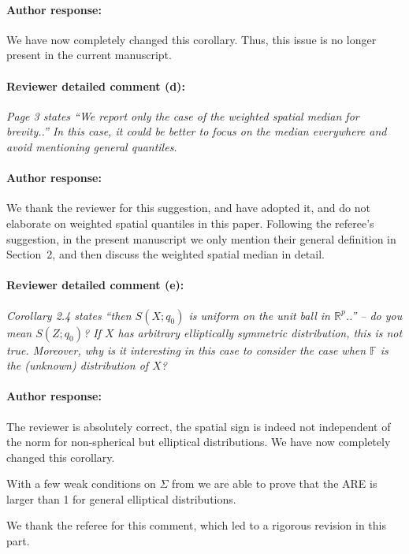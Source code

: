 \documentclass[11pt,letterpaper]{article}
\newcommand{\BF}{{\mathbb{F}}}
\newcommand{\BR}{{\mathbb{R}}}
\theoremstyle{definition} \newtheorem{Definition}[Theorem]{Definition}
\begin{document}
\paragraph{Author response:}
We have now completely changed this corollary. Thus, this issue is no longer present in the current manuscript. 


\paragraph{Reviewer detailed comment (d):}
\textit{Page 3 states “We report only the case of the weighted spatial median for brevity..” In this case, it could be better to focus on the median everywhere and avoid mentioning general quantiles.
}

\paragraph{Author response:}
We thank the reviewer for this suggestion, and have adopted it, and do not elaborate on weighted spatial quantiles in this paper. Following the referee's suggestion, in the present manuscript we only mention their general definition in Section~2, and then discuss the weighted spatial median in detail. 

\paragraph{Reviewer detailed comment (e):}
\textit{Corollary 2.4 states “then $S(X; q_0)$ is uniform on the unit ball in $\BR^p$..” – do you mean $S(Z; q_0)$? If $X$ has arbitrary elliptically symmetric distribution, this is not true. Moreover, why is it interesting in this case to consider the case when $\BF$ is the (unknown) distribution of $X$?
}

\paragraph{Author response:}
The reviewer is absolutely correct, the spatial sign is indeed not independent of the norm for non-spherical but elliptical distributions. We have now completely changed this corollary. 

With a few weak conditions on $\Sigma$ from \cite{ref:JASA151658_WangPengLi} 
we are able to prove that the ARE is larger than 1 for general elliptical distributions. 

We thank the referee for this comment, which led to a rigorous revision in this part.
\end{document}
